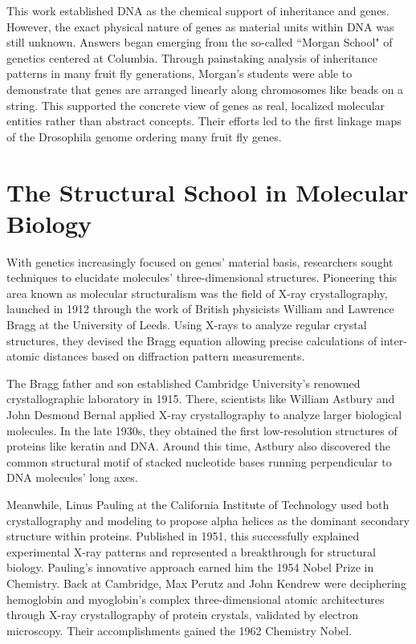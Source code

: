 This work established DNA as the chemical support of inheritance and genes. However, the exact physical nature of genes as material units within DNA was still unknown. Answers began emerging from the so-called ``Morgan School" of genetics centered at Columbia. Through painstaking analysis of inheritance patterns in many fruit fly generations, Morgan's students were able to demonstrate that genes are arranged linearly along chromosomes like beads on a string. This supported the concrete view of genes as real, localized molecular entities rather than abstract concepts. Their efforts led to the first linkage maps of the Drosophila genome ordering many fruit fly genes.

\section{The Structural School in Molecular Biology}

With genetics increasingly focused on genes' material basis, researchers sought techniques to elucidate molecules' three-dimensional structures. Pioneering this area known as molecular structuralism was the field of X-ray crystallography, launched in 1912 through the work of British physicists William and Lawrence Bragg at the University of Leeds. Using X-rays to analyze regular crystal structures, they devised the Bragg equation allowing precise calculations of inter-atomic distances based on diffraction pattern measurements.

The Bragg father and son established Cambridge University's renowned crystallographic laboratory in 1915. There, scientists like William Astbury and John Desmond Bernal applied X-ray crystallography to analyze larger biological molecules. In the late 1930s, they obtained the first low-resolution structures of proteins like keratin and DNA. Around this time, Astbury also discovered the common structural motif of stacked nucleotide bases running perpendicular to DNA molecules' long axes.

Meanwhile, Linus Pauling at the California Institute of Technology used both crystallography and modeling to propose alpha helices as the dominant secondary structure within proteins. Published in 1951, this successfully explained experimental X-ray patterns and represented a breakthrough for structural biology. Pauling's innovative approach earned him the 1954 Nobel Prize in Chemistry. Back at Cambridge, Max Perutz and John Kendrew were deciphering hemoglobin and myoglobin's complex three-dimensional atomic architectures through X-ray crystallography of protein crystals, validated by electron microscopy. Their accomplishments gained the 1962 Chemistry Nobel.

